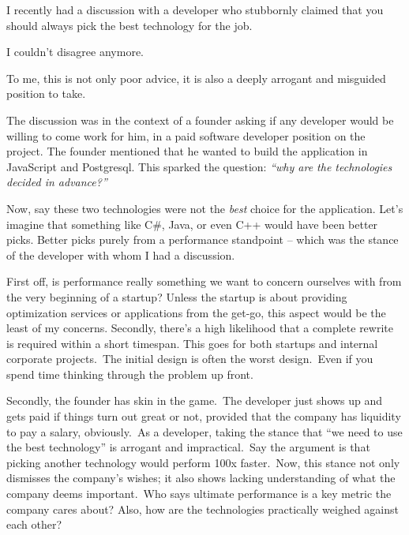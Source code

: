\documentclass{article}
\title{\sffamily{Don't Pick the Best Technology for the Job}}
\author{
    \sffamily Nicklas Millard \\
    \sffamily Principal Software Engineer \\
    \texttt{nicklas@mjukvare.com}
}
\begin{document}
    \maketitle
    
    I recently had a discussion with a developer who stubbornly claimed that you should always pick the 
    best technology for the job.

    I couldn't disagree anymore.
    
    To me, this is not only poor advice, it is also a deeply arrogant and misguided position to take.

    The discussion was in the context of a founder asking if any developer would be willing to come work for him, in a paid
    software developer position on the project.
    The founder mentioned that he wanted to build the application in JavaScript and Postgresql. This sparked the 
    question: \textit{``why are the technologies decided in advance?''}
    
    Now, say these two technologies were not the \textit{best} choice for the application. 
    Let's imagine that something like C\#, Java, or even C++ would have been better picks. 
    Better picks purely from a performance standpoint – which was the stance of the developer with whom I had a discussion.
    
    First off, is performance really something we want to concern ourselves with from the very beginning of a startup?
    Unless the startup is about providing optimization services or applications from the get-go, this aspect would 
    be the least of my concerns.
    Secondly, there's a high likelihood that a complete rewrite is required within a short timespan. 
    This goes for both startups and internal corporate projects.\ The initial design is often the worst design.\ Even if you
    spend time thinking through the problem up front.
    
    Secondly, the founder has skin in the game.\ The developer just shows up and gets paid if things turn out great or not,
    provided that the company has liquidity to pay a salary, obviously.\ As a developer, taking the stance that 
    ``we need to use the best technology'' is arrogant and impractical.\ Say the argument is that picking another technology
    would perform 100x faster.\ Now, this stance not only dismisses the company's wishes; it also shows lacking
    understanding of what the company deems important.\ Who says ultimate performance is a key metric the company cares
    about? Also, how are the technologies practically weighed against each other?
    
\end{document}
